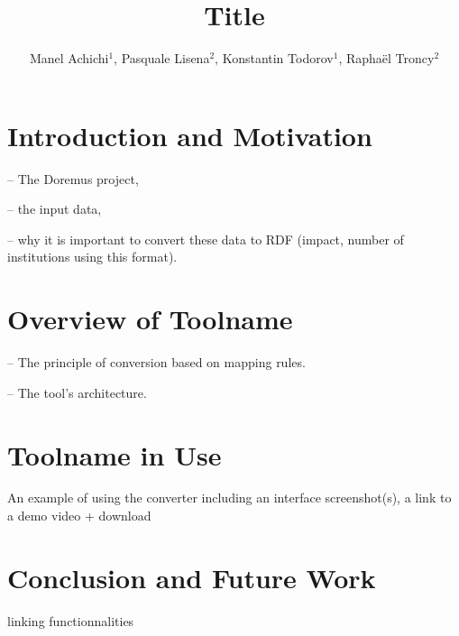 \documentclass[runningheads,a4paper]{llncs}
\title{Title}
\author{Manel Achichi$^1$, Pasquale Lisena$^2$, Konstantin Todorov$^1$, Rapha\"{e}l Troncy$^2$}
\institute{$^1$University of Montpellier, $^2$Eurecom}
\begin{document}
\maketitle

\begin{abstract}

\end{abstract}

\section{Introduction and Motivation}

-- The Doremus project,

-- the input data,

-- why it is important to convert these data to RDF (impact, number of institutions using this format).

\section{Overview of Toolname}

-- The principle of conversion based on mapping rules.

-- The tool's architecture.

\section{Toolname in Use}

An example of using the converter including an interface screenshot(s), a link to a demo video + download

\section{Conclusion and Future Work}

linking functionnalities


\end{document}
